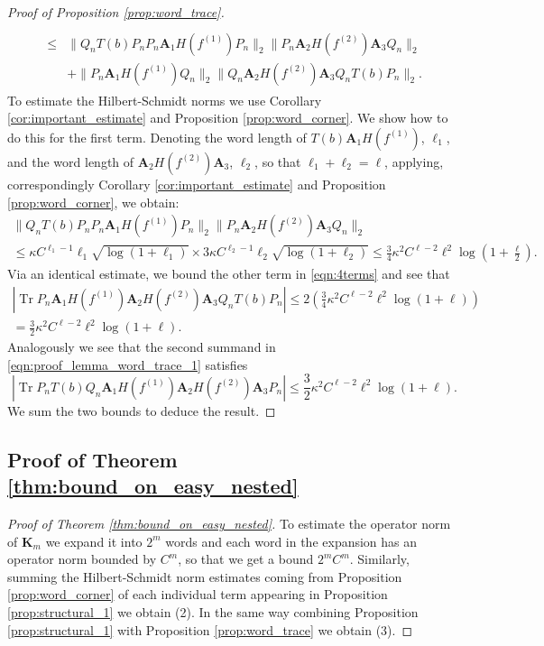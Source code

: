 \documentclass[11pt]{amsart}
\theoremstyle{plain}
\theoremstyle{remark}
\DeclareMathOperator{\Tr}{Tr}
\numberwithin{equation}{section}
\begin{document}
\begin{proof}[Proof of Proposition \ref{prop:word_trace}]
\begin{multline}
\\
\begin{aligned}
\leq & \|Q_nT(b)P_n P_n \mathbf{A}_1
H(f^{(1)})P_n\|_2
\|P_n \mathbf{A}_2 H(f^{(2)}) \mathbf{A}_3Q_n\|_2
\\&+ \|P_n \mathbf{A}_1 
H(f^{(1)})Q_n\|_2
\|Q_n \mathbf{A}_2 H(f^{(2)})
\mathbf{A}_3Q_nT(b)P_n\|_2.
\end{aligned}
\end{multline}
To estimate the Hilbert-Schmidt norms we use Corollary \ref{cor:important_estimate} and Proposition \ref{prop:word_corner}.
We show how to do this for the first term. Denoting the word length of 
$T(b)\mathbf{A}_1H(f^{(1)})$, $\ell_1$, and the word length of 
$\mathbf{A}_2 H(f^{(2)}) \mathbf{A}_3$, $\ell_2$, so that $\ell_1+\ell_2=\ell$, applying, correspondingly Corollary \ref{cor:important_estimate} and Proposition \ref{prop:word_corner},
 we obtain:
 \begin{multline}
 \|Q_nT(b)P_n P_n \mathbf{A}_1
 H(f^{(1)})P_n\|_2
 \|P_n \mathbf{A}_2 H(f^{(2)}) \mathbf{A}_3Q_n\|_2
 \\\leq \kappa C^{\ell_1-1}\ell_1\sqrt{\log(1+\ell_1)}
 \times
 3\kappa C^{\ell_2-1}\ell_2\sqrt{\log(1+\ell_2)}\leq \frac{3}{4}\kappa^2 C^{\ell-2}\ell^2 \log\left(1+\frac{\ell}{2}\right).
 \end{multline}
Via an identical estimate,  we bound the other term in \eqref{eqn:4terms} and see that
\begin{multline}
|\Tr P_n \mathbf{A}_1 H(f^{(1)}) \mathbf{A}_2 H(f^{(2)}) \mathbf{A}_3Q_nT(b)P_n|
 \leq
2 \left(\frac{3}{4}\kappa^2 C^{\ell-2} \ell^2 \log(1+\ell)\right)
\\= \frac{3}{2} \kappa^2C^{\ell-2} \ell^2 \log(1+\ell).
\end{multline}
Analogously we see that the second summand in \eqref{eqn:proof_lemma_word_trace_1} satisfies
\begin{equation}
| \Tr P_n T(b) Q_n\mathbf{A}_1 H(f^{(1)}) \mathbf{A}_2 H(f^{(2)}) \mathbf{A}_3P_n|
\leq
\frac{3}{2} \kappa^2 C^{\ell-2} \ell^2 \log(1+\ell).
\end{equation}
We sum the two bounds to deduce the result.
\end{proof}

\subsection{Proof of Theorem 
\ref{thm:bound_on_easy_nested}}

\begin{proof}[Proof of Theorem \ref{thm:bound_on_easy_nested}]
To estimate the operator norm of $\mathbf{K}_m$ we expand it into $2^m$ words and each word in the expansion has an operator norm bounded by $C^m$, so that we get a bound $2^m C^m$.
Similarly, summing the Hilbert-Schmidt norm estimates coming from Proposition \ref{prop:word_corner} of each individual term appearing in Proposition \ref{prop:structural_1} we obtain (2). In the same way combining  Proposition \ref{prop:structural_1} with Proposition \ref{prop:word_trace} we obtain (3).
\end{proof}
%
%
%
\end{document}
